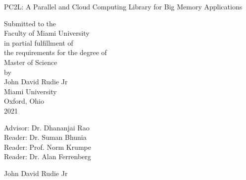 \documentclass[12pt, oneside]{book2}
\begin{document}
\begin{titlepage}
\begin{center}
PC2L: A Parallel and Cloud Computing Library for Big Memory Applications

\vspace{1.5cm}


\vspace{0.5cm}

Submitted to the \\
Faculty of Miami University \\
in partial fulfillment of \\
the requirements for the degree of \\
Master of Science \\
by \\
John David Rudie Jr \\
Miami University \\
Oxford, Ohio \\
2021

\vspace{1.5cm}

Advisor: Dr. Dhananjai Rao\\
Reader: Dr. Suman Bhunia \\
Reader: Prof. Norm Krumpe\\
Reader: Dr. Alan Ferrenberg\\


\vspace{1.5cm}

 John David Rudie Jr

\end{center}

\end{titlepage}




\singlespacing
\setcounter{page}{3}
\tableofcontents
\setcounter{tocdepth}{2}
\cleardoublepage
{}
\listoftables
\cleardoublepage
{}
\listoffigures

\newpage


\mainmatter











\backmatter



\end{document}
